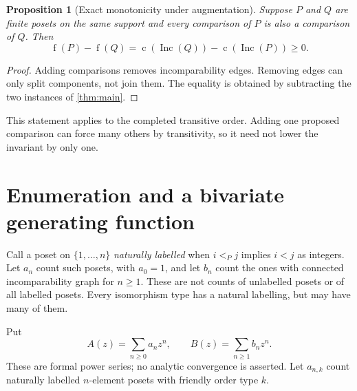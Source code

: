 \documentclass[11pt,letterpaper]{article}
\newtheorem{proposition}[proposition]{Proposition}
\theoremstyle{definition}
\theoremstyle{remark}
\newcommand{\fot}{\operatorname{f}}
\newcommand{\Inc}{\operatorname{Inc}}
\newcommand{\cc}{\operatorname{c}}
\begin{document}
\begin{proposition}[Exact monotonicity under augmentation]
Suppose $P$ and $Q$ are finite posets on the same support and every
comparison of $P$ is also a comparison of $Q$. Then
\[
 \fot(P)-\fot(Q)=\cc(\Inc(Q))-\cc(\Inc(P))\geq0.
\]
\end{proposition}
\begin{proof}
Adding comparisons removes incomparability edges. Removing edges can only
split components, not join them. The equality is obtained by subtracting
the two instances of \cref{thm:main}.
\end{proof}
This statement applies to the completed transitive order. Adding one proposed
comparison can force many others by transitivity, so it need not lower the
invariant by only one.

\section{Enumeration and a bivariate generating function}
\label{sec:enumeration}
Call a poset on $\{1,\ldots,n\}$ \emph{naturally labelled} when $i<_P j$
implies $i<j$ as integers. Let $a_n$ count such posets, with $a_0=1$, and
let $b_n$ count the ones with connected incomparability graph for $n\geq1$.
These are not counts of unlabelled posets or of all labelled posets.
Every isomorphism type has a natural labelling, but may have many of them.

Put
\[
 A(z)=\sum_{n\geq0}a_nz^n,
 \qquad B(z)=\sum_{n\geq1}b_nz^n.
\]
These are formal power series; no analytic convergence is asserted.
Let $a_{n,k}$ count naturally labelled $n$-element posets with friendly
order type $k$.
\end{document}
